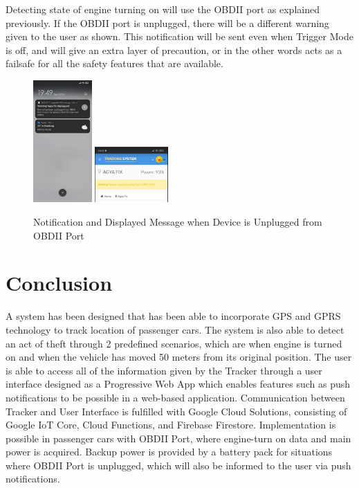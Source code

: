 \documentclass[conference]{IEEEtran}
\begin{document}
Detecting state of engine turning on will use the OBDII port as explained previously. If the OBDII port is unplugged, there will be a different warning given to the user as shown. This notification will be sent even when Trigger Mode is off, and will give an extra layer of precaution, or in the other words acts as a failsafe for all the safety features that are available.
\begin{figure}[htbp]
    \centering
    \includegraphics[width=0.2\textwidth]{notif3}
    \includegraphics[width=0.25\textwidth]{notif4}
    \caption{Notification and Displayed Message when Device is Unplugged from OBDII Port}
    \label{fig1}
\end{figure}

\section{Conclusion}
A system has been designed that has been able to incorporate GPS and GPRS technology to track location of passenger cars. The system is also able to detect an act of theft through 2 predefined scenarios, which are when engine is turned on and when the vehicle has moved 50 meters from its original position. 
The user is able to access all of the information given by the Tracker through a user interface designed as a Progressive Web App which enables features such as push notifications to be possible in a web-based application. Communication between Tracker and User Interface is fulfilled with Google Cloud Solutions, consisting of Google IoT Core, Cloud Functions, and Firebase Firestore. 
Implementation is possible in passenger cars with OBDII Port, where engine-turn on data and main power is acquired. Backup power is provided by a battery pack for situations where OBDII Port is unplugged, which will also be informed to the user via push notifications. 
\end{document}
